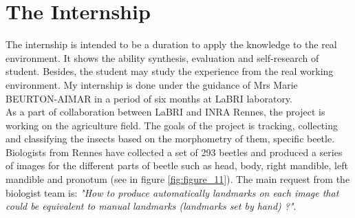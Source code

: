 \section{The Internship}
The internship is intended to be a duration to apply the knowledge to the real environment. It shows the ability synthesis, evaluation and self-research of student. Besides, the student may study the experience from the real working environment. My internship is done under the guidance of Mrs Marie BEURTON-AIMAR in a period of six months at LaBRI laboratory.\\[0.2cm]
As a part of collaboration between LaBRI and INRA Rennes, the project is working on the agriculture field. The goals of the project is tracking, collecting and classifying the insects based on the morphometry of them, specific beetle. Biologists from Rennes have collected a set of 293 beetles and produced a series of images for the different parts of beetle such as head, body, right mandible, left mandible and pronotum (see in figure \ref{fig:figure_11}). The main request from the biologist team is: \textit{"How to produce automatically landmarks on each image that could be equivalent to manual landmarks (landmarks set by hand) ?"}.
